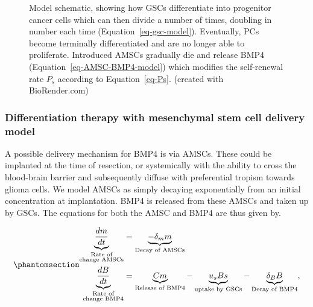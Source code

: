 \documentclass[
  letterpaper,
]{scrreprt}
\theoremstyle{definition}
\theoremstyle{remark}
\begin{document}
\begin{figure}


\caption{\label{fig-model_schematic}Model schematic, showing how GSCs
differentiate into progenitor cancer cells which can then divide a
number of times, doubling in number each time
(Equation~\ref{eq-gsc-model}). Eventually, PCs become terminally
differentiated and are no longer able to proliferate. Introduced AMSCs
gradually die and release BMP4 (Equation~\ref{eq-AMSC-BMP4-model}) which
modifies the self-renewal rate \(P_s\) according to
Equation~\ref{eq-Ps}. (created with BioRender.com)}

\end{figure}%

\subsubsection{Differentiation therapy with mesenchymal stem cell
delivery model}\label{sec-differentiation-therapy}

A possible delivery mechanism for BMP4 is via AMSCs. These could be
implanted at the time of resection, or systemically with the ability to
cross the blood-brain barrier and subsequently diffuse with preferential
tropism towards glioma cells. We model AMSCs as simply decaying
exponentially from an initial concentration at implantation. BMP4 is
released from these AMSCs and taken up by GSCs. The equations for both
the AMSC and BMP4 are thus given by.

\begin{equation}\phantomsection\label{eq-AMSC-BMP4-model}{
\begin{aligned}
    \underbrace{\frac{d m}{d t}}_{
    \substack{\text{Rate of} \\ \text{change AMSCs}}} &= \underbrace{-\delta_m m}_\text{Decay of AMSCs} \\ 
    \underbrace{\frac{d B}{d t}}_{
    \substack{\text{Rate of} \\ \text{change BMP4}}} &=  \underbrace{C m}_\text{Release of BMP4} - \underbrace{u_sBs}_\text{uptake by GSCs} - \underbrace{\delta_B B}_\text{Decay of BMP4}, 
\end{aligned} 
}\end{equation}
\end{document}
